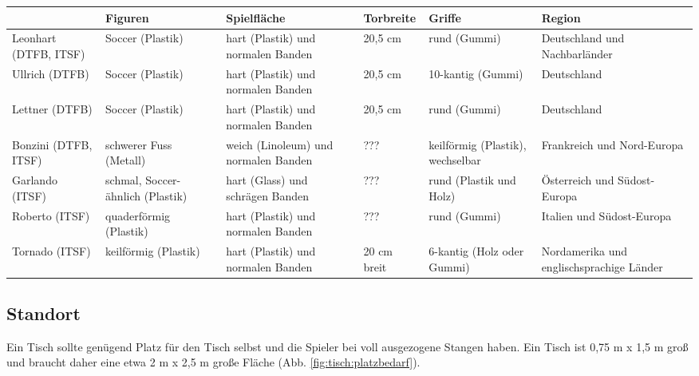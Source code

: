{\small
\begin{center} 
\begin{table} 
\begin{tabular}{ p{1.5cm}||p{2cm}|p{2cm}|p{2cm}|p{2cm}|p{2cm}} 
 	& Figuren & Spielfläche & Torbreite & Griffe & Region \\ 
\hline 
\hline 
Leonhart (DTFB, ITSF) & Soccer (Plastik) & hart (Plastik) und normalen Banden & 20,5 cm & rund (Gummi) & Deutschland und Nachbarländer \\ 
\hline 
Ullrich  (DTFB) &  Soccer (Plastik) &  hart (Plastik) und normalen Banden & 20,5 cm & 10-kantig (Gummi) & Deutschland \\ 
\hline 
Lettner (DTFB)  & Soccer (Plastik)  &  hart (Plastik) und normalen Banden & 20,5 cm & rund (Gummi) & Deutschland \\ 
\hline 
Bonzini (DTFB, ITSF)  & schwerer Fuss (Metall) & weich (Linoleum) und normalen Banden & ??? & keilförmig (Plastik), wechselbar & Frankreich und Nord-Europa \\ 
\hline 
Garlando (ITSF)  & schmal, Soccer-ähnlich (Plastik) &  hart (Glass) und schrägen Banden & ??? & rund (Plastik und Holz) & Österreich und Südost-Europa \\ 
\hline 
Roberto (ITSF) & quaderförmig (Plastik) &  hart (Plastik) und normalen Banden & ??? & rund (Gummi) & Italien und Südost-Europa \\ 
\hline 
Tornado (ITSF)  & keilförmig (Plastik) &  hart (Plastik) und normalen Banden & 20 cm breit & 6-kantig (Holz oder Gummi) & Nordamerika und englischsprachige Länder \\ 
\end{tabular} 
\label{tab:tische}
\end{table} 
\end{center}
}



\subsection{Standort}
\label{tisch:tisch:standort}




Ein Tisch sollte genügend Platz für den Tisch selbst und die Spieler bei voll ausgezogene Stangen haben. Ein Tisch ist  0,75 m x 1,5 m groß und braucht daher eine etwa 2 m x 2,5 m große Fläche (Abb. \ref{fig:tisch:platzbedarf}).

